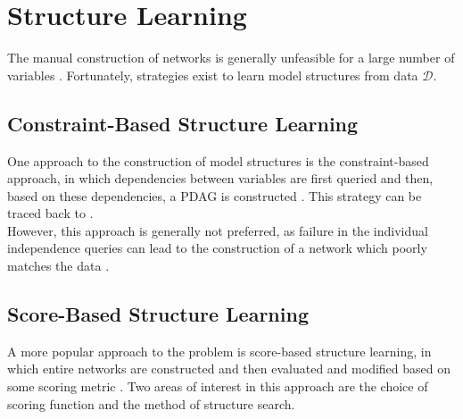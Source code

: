 \documentclass [11pt]{article}
\begin{document}
\section{Structure Learning}\label{StructureLearning}
The manual construction of networks is generally unfeasible for a large number of variables \citep{koller09}. Fortunately, strategies exist to learn model structures from data $\mathcal{D}$.
\subsection{Constraint-Based Structure Learning}\label{ConstraintBasedStructureLearning}
One approach to the construction of model structures is the constraint-based approach, in which dependencies between variables are first queried and then, based on these dependencies, a PDAG is constructed \citep{koller09}. This strategy can be traced back to \citet{verma91}. 
\\
However, this approach is generally not preferred, as failure in the individual independence queries can lead to the construction of a network which poorly matches the data \citep{koller09}.
\subsection{Score-Based Structure Learning}\label{ScoreBasedStructureLearning}
A more popular approach to the problem is score-based structure learning, in which entire networks are constructed and then evaluated and modified based on some scoring metric \citep{koller09}. Two areas of interest in this approach are the choice of scoring function and the method of structure search.
\end{document}
